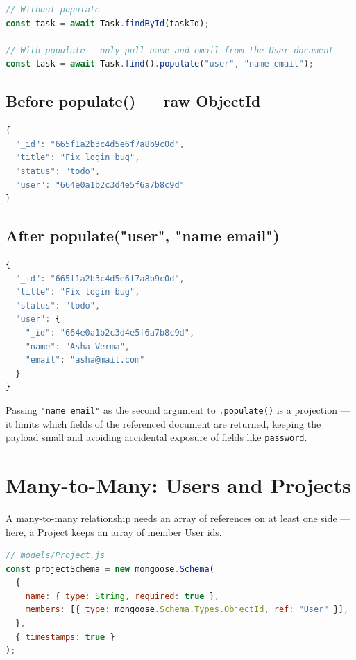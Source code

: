 \begin{lstlisting}[language=JavaScript]
// Without populate
const task = await Task.findById(taskId);

// With populate - only pull name and email from the User document
const task = await Task.find().populate("user", "name email");
\end{lstlisting}

\subsection{Before populate() — raw ObjectId}

\begin{lstlisting}[language=JavaScript]
{
  "_id": "665f1a2b3c4d5e6f7a8b9c0d",
  "title": "Fix login bug",
  "status": "todo",
  "user": "664e0a1b2c3d4e5f6a7b8c9d"
}
\end{lstlisting}

\subsection{After populate("user", "name email")}

\begin{lstlisting}[language=JavaScript]
{
  "_id": "665f1a2b3c4d5e6f7a8b9c0d",
  "title": "Fix login bug",
  "status": "todo",
  "user": {
    "_id": "664e0a1b2c3d4e5f6a7b8c9d",
    "name": "Asha Verma",
    "email": "asha@mail.com"
  }
}
\end{lstlisting}

\begin{notebox}[NOTE]
Passing \texttt{"name email"} as the second argument to \texttt{.populate()} is a projection —
it limits which fields of the referenced document are returned, keeping the payload
small and avoiding accidental exposure of fields like \texttt{password}.
\end{notebox}

\section{Many-to-Many: Users and Projects}

A many-to-many relationship needs an array of references on at least one side —
here, a Project keeps an array of member User ids.

\begin{lstlisting}[language=JavaScript]
// models/Project.js
const projectSchema = new mongoose.Schema(
  {
    name: { type: String, required: true },
    members: [{ type: mongoose.Schema.Types.ObjectId, ref: "User" }],
  },
  { timestamps: true }
);
\end{lstlisting}

